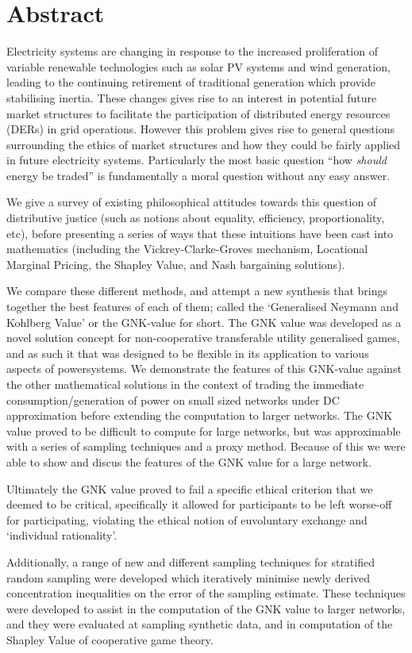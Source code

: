 \chapter*{Abstract}
\vspace{-1em}


Electricity systems are changing in response to the increased proliferation of variable renewable technologies such as solar PV systems and wind generation, leading to the continuing retirement of traditional generation which provide stabilising inertia.
These changes gives rise to an interest in potential future market structures to facilitate the participation of distributed energy resources (DERs) in grid operations.
However this problem gives rise to general questions surrounding the ethics of market structures and how they could be fairly applied in future electricity systems. Particularly the most basic question ``how \textit{should} energy be traded'' is fundamentally a moral question without any easy answer.

We give a survey of existing philosophical attitudes towards this question of distributive justice (such as notions about equality, efficiency, proportionality, etc), before presenting a series of ways that these intuitions have been cast into mathematics (including the Vickrey-Clarke-Groves mechanism, Locational Marginal Pricing, the Shapley Value, and Nash bargaining solutions).

We compare these different methods, and attempt a new synthesis that brings together the best features of each of them; called the `Generalised Neymann and Kohlberg Value' or the GNK-value for short.
The GNK value was developed as a novel solution concept for non-cooperative transferable utility generalised games, and as such it that was designed to be flexible in its application to various aspects of powersystems.
We demonstrate the features of this GNK-value against the other mathematical solutions in the context of trading the immediate consumption/generation of power on small sized networks under DC approximation before extending the computation to larger networks.
The GNK value proved to be difficult to compute for large networks, but was approximable with a series of sampling techniques and a proxy method.
Because of this we were able to show and discus the features of the GNK value for a large network.

Ultimately the GNK value proved to fail a specific ethical criterion that we deemed to be critical, specifically it allowed for participants to be left worse-off for participating, violating the ethical notion of euvoluntary exchange and `individual rationality'.

Additionally, a range of new and different sampling techniques for stratified random sampling were developed which iteratively minimise newly derived concentration inequalities on the error of the sampling estimate.
These techniques were developed to assist in the computation of the GNK value to larger networks, and they were evaluated at sampling synthetic data, and in computation of the Shapley Value of cooperative game theory.




